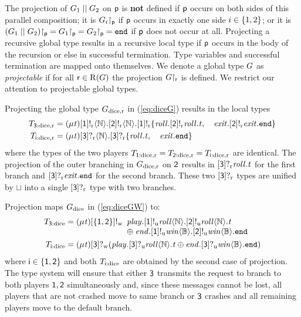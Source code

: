 The projection of $ \GPar{\GT_1}{\GT_2} $ on $ \Role[p] $ is \textbf{not} defined if $ \Role[p] $ occurs on both sides of this parallel composition; it is $ \Proj{\GT_i}{\Role[p]} $ if $ \Role[p] $ occurs in exactly one side $ i \in \Set{ 1, 2 } $; or it is $ \Proj{\left( \GPar{\GT_1}{\GT_2} \right)}{\Role[p]} = \Proj{\GT_1}{\Role[p]} = \Proj{\GT_2}{\Role[p]} = \LEnd $ if $ \Role[p] $ does not occur at all.
Projecting a recursive global type results in a recursive local type if $ \Role[p] $ occurs in the body of the recursion or else in successful termination.
Type variables and successful termination are mapped onto themselves.
We denote a global type $ \GT $ as \emph{projectable} if for all $ \Role \in \Roles{\GT} $ the projection $ \Proj{\GT}{\Role} $ is defined.
We restrict our attention to projectable global types.

Projecting the global type $ \GDice $ in (\ref{eq:diceG}) results in the local types
\begin{align*}
	\LDice{\Role[3]} &= \LRep{\TypeV}{\LSendR{\Role[1]}{\nat}{\LSendR{\Role[2]}{\nat}{\LSelR{\Role[1]}{{\Set{\Label[roll].\LSelR{\Role[2]}{\Label[roll].\TypeV}, \quad \Label[exit].\LSelR{\Role[2]}{\Label[exit].\LEnd}}}}}}}\\
	\LDice{\Role[i]} &= \LRep{\TypeV}{\LGetR{\Role[3]}{\nat}{\LBranR{\Role[3]}{\Set{\Label[roll].\TypeV, \quad \Label[exit].\LEnd}}}}
\end{align*}
where the types of the two players $ \LDice{\Role[1]} = \LDice{\Role[2]} = \LDice{\Role[i]} $ are identical.
The projection of the outer branching in $ \GDice $ on $ \Role[2] $ results in $ \LBranR{\Role[3]}{\Label[roll].\TypeV} $ for the first branch and $ \LBranR{\Role[3]}{\Label[exit].\LEnd} $ for the second branch.
These two $ \LBranR{\Role[3]}{} $ types are unified by $ \sqcup $ into a single $ \LBranR{\Role[3]}{} $ type with two branches.

Projection maps $ \GDiceW $ in (\ref{eq:diceGW}) to:
\begin{align*}
	\LDiceW{\Role[3]} &= \LRep{\TypeV}{\LSelW{\Set{ \Role[1], \Role[2] }}{}
		\begin{array}[t]{l}
			\Label[play].\LSendU{\Role[1]}{\Label[roll]}{\nat}{\LSendU{\Role[2]}{\Label[roll]}{\nat}{\TypeV}}\\
			\oplus \; \Label[end].\LSendU{\Role[1]}{\Label[win]}{\bool}{\LSendU{\Role[2]}{\Label[win]}{\bool}{\LEnd}}
		\end{array}}\\
	\LDiceW{\Role[i]} &= \LRep{\TypeV}{\LBranW{\Role[3]}{\left( \Label[play].\LGetU{\Role[3]}{\Label[roll]}{\nat}{\TypeV} \oplus \Label[end].\LGetU{\Role[3]}{\Label[win]}{\bool}{\LEnd} \right)}}
\end{align*}
where $ \Role[i] \in \Set{ \Role[1], \Role[2] } $ and both $ \LDiceW{\Role[i]} $ are obtained by the second case of projection.
The type system will ensure that either $ \Role[3] $ transmits the request to branch to both players $ \Role[1], \Role[2] $ simultaneously and, since these messages cannot be lost, all players that are not crashed move to same branch or $ \Role[3] $ crashes and all remaining players move to the default branch.

